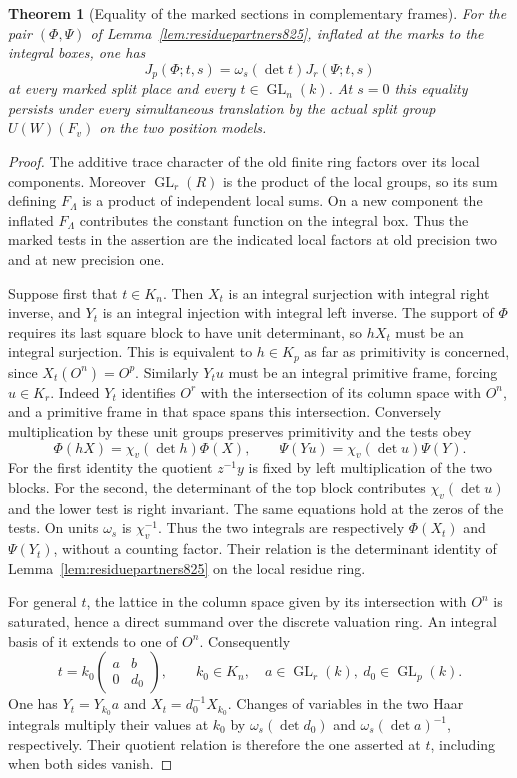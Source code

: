 \documentclass[a4paper,11pt]{article}
\newtheorem{theorem}[proposition]{Theorem}
\theoremstyle{definition}
\theoremstyle{remark}
\numberwithin{equation}{section}
\begin{document}
\begin{theorem}[Equality of the marked sections in complementary frames]
\leavevmode\label{thm:marksections835}
For the pair \((\Phi,\Psi)\) of Lemma~\ref{lem:residuepartners825},
inflated at the marks to the integral boxes, one has
\[
                 J_p(\Phi;t,s)=\omega_s(\det t)J_r(\Psi;t,s)
\]
at every marked split place and every \(t\in\operatorname{GL}_n(k)\).
At \(s=0\) this equality persists under every simultaneous
translation by the actual split group \(U(W)(F_v)\) on the
two position models.
\end{theorem}
\begin{proof}
The additive trace character of the old finite ring factors
over its local components. Moreover \(\operatorname{GL}_r(R)\)
is the product of the local groups, so its sum defining
\(F_\Lambda\) is a product of independent local sums. On a
new component the inflated \(F_\Lambda\) contributes the
constant function on the integral box. Thus the marked tests
in the assertion are the indicated local factors at old
precision two and at new precision one.

Suppose first that \(t\in K_n\). Then \(X_t\) is an integral
surjection with integral right inverse, and \(Y_t\) is an
integral injection with integral left inverse. The support
of \(\Phi\) requires its last square block to have unit
determinant, so \(hX_t\) must be an integral surjection.
This is equivalent to \(h\in K_p\) as far as primitivity
is concerned, since \(X_t(O^n)=O^p\). Similarly \(Y_tu\)
must be an integral primitive frame, forcing \(u\in K_r\).
Indeed \(Y_t\) identifies \(O^r\) with the intersection
of its column space with \(O^n\), and a primitive frame in
that space spans this intersection. Conversely multiplication
by these unit groups preserves primitivity and the tests
obey
\[
     \Phi(hX)=\chi_v(\det h)\Phi(X),\qquad
     \Psi(Yu)=\chi_v(\det u)\Psi(Y).
\]
For the first identity the quotient \(z^{-1}y\) is fixed
by left multiplication of the two blocks. For the second,
the determinant of the top block contributes \(\chi_v(\det u)\)
and the lower test is right invariant. The same equations
hold at the zeros of the tests. On units \(\omega_s\) is
\(\chi_v^{-1}\). Thus the two integrals are respectively
\(\Phi(X_t)\) and \(\Psi(Y_t)\), without a counting factor.
Their relation is the determinant identity of
Lemma~\ref{lem:residuepartners825} on the local residue ring.

For general \(t\), the lattice in the column space given by
its intersection with \(O^n\) is saturated, hence a direct
summand over the discrete valuation ring. An integral basis
of it extends to one of \(O^n\). Consequently
\[
 t=k_0\begin{pmatrix}a&b\\0&d_0\end{pmatrix},
 \qquad k_0\in K_n,\quad a\in\operatorname{GL}_r(k),\
 d_0\in\operatorname{GL}_p(k).
\]
One has \(Y_t=Y_{k_0}a\) and \(X_t=d_0^{-1}X_{k_0}\).
Changes of variables in the two Haar integrals multiply
their values at \(k_0\) by \(\omega_s(\det d_0)\) and
\(\omega_s(\det a)^{-1}\), respectively. Their quotient
relation is therefore the one asserted at \(t\), including
when both sides vanish.


\end{proof}
\end{document}
